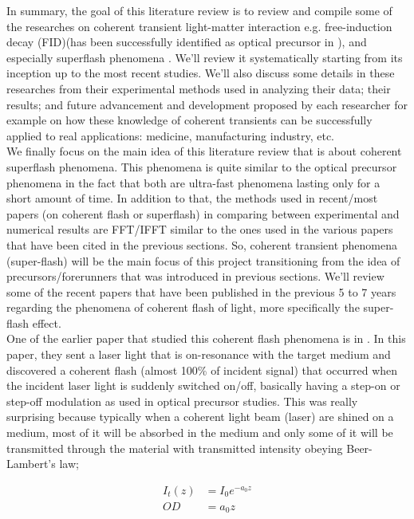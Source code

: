 In summary, the goal of this literature review is to review and compile some of the researches on coherent transient light-matter interaction e.g. free-induction decay (FID)(has been successfully identified as optical precursor in \cite{Chen2010}), and especially superflash phenomena \cite{Kwong2014}. We'll review it systematically starting from its inception up to the most recent studies. We'll also discuss some details in these researches from their experimental methods used in analyzing their data; their results; and future advancement and development proposed by each researcher for example on how these knowledge of coherent transients can be successfully applied to real applications: medicine, manufacturing industry, etc.\\

We finally focus on the main idea of this literature review that is about coherent superflash phenomena. This phenomena is quite similar to the optical precursor phenomena in the fact that both are ultra-fast phenomena lasting only for a short amount of time. In addition to that, the methods used in recent/most papers (on coherent flash or superflash) in comparing between experimental and numerical results are FFT/IFFT similar to the ones used in the various papers that have been cited in the previous sections. So, coherent transient phenomena (super-flash) will be the main focus of this project transitioning from the idea of precursors/forerunners that was introduced in previous sections. We'll review some of the recent papers that have been published in the previous 5 to 7 years regarding the phenomena of coherent flash of light, more specifically the super-flash effect.\\

One of the earlier paper that studied this coherent flash phenomena is in \cite{Chalony2011}. In this paper, they sent a laser light that is on-resonance with the target medium and discovered a coherent flash (almost 100\% of incident signal) that occurred when the incident laser light is suddenly switched on/off, basically having a step-on or step-off modulation as used in optical precursor studies. This was really surprising because typically when a coherent light beam (laser) are shined on a medium, most of it will be absorbed in the medium and only some of it will be transmitted through the material with transmitted intensity obeying Beer-Lambert's law;

\begin{align}
    I_{t}(z) &= I_{0} e^{-a_{0} z}\\
    OD &= a_{0} z
\end{align}

